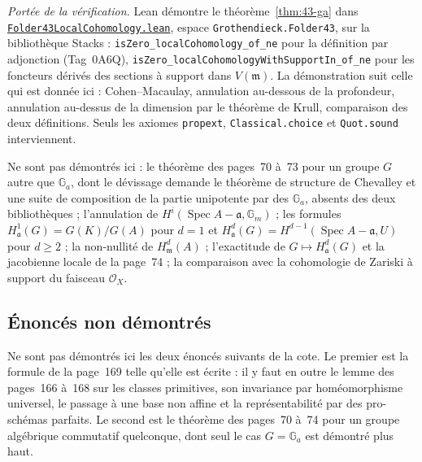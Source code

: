 \begingroup\raggedright
\noindent\emph{Portée de la vérification.} Lean démontre le théorème~\ref{thm:43-ga} dans \href{\leanblobmain/RingTheory/Folder43LocalCohomology.lean}{\texttt{Folder43LocalCohomology.\allowbreak{}lean}}, espace \texttt{Grothendieck.\allowbreak{}Folder43}, sur la bibliothèque Stacks : \texttt{isZero\_localCohomology\_of\_ne} pour la définition par adjonction (Tag~0A6Q), \texttt{isZero\_localCohomologyWithSupportIn\_of\_ne} pour les foncteurs dérivés des sections à support dans $V(\mathfrak m)$. La démonstration suit celle qui est donnée ici : Cohen--Macaulay, annulation au-dessous de la profondeur, annulation au-dessus de la dimension par le théorème de Krull, comparaison des deux définitions. Seuls les axiomes \texttt{propext}, \texttt{Classical.choice} et \texttt{Quot.sound} interviennent.\par\endgroup

Ne sont pas démontrés ici : le théorème des pages~70 à~73 pour un groupe $G$ autre que $\mathbb G_a$, dont le dévissage demande le théorème de structure de Chevalley et une suite de composition de la partie unipotente par des $\mathbb G_a$, absents des deux bibliothèques ; l'annulation de $H^i(\operatorname{Spec} A - \mathfrak a, \mathbb G_m)$ ; les formules $H^1_{\mathfrak a}(G) = G(K)/G(A)$ pour $d = 1$ et $H^d_{\mathfrak a}(G) = H^{d-1}(\operatorname{Spec} A - \mathfrak a, U)$ pour $d \geq 2$ ; la non-nullité de $H^d_{\mathfrak m}(A)$ ; l'exactitude de $G \mapsto H^d_{\mathfrak a}(G)$ et la jacobienne locale de la page~74 ; la comparaison avec la cohomologie de Zariski à support du faisceau $\mathcal O_X$.

\subsection*{Énoncés non démontrés}

Ne sont pas démontrés ici les deux énoncés suivants de la cote. Le premier est la formule de la page~169 telle qu'elle est écrite : il y faut en outre le lemme des pages~166 à~168 sur les classes primitives, son invariance par homéomorphisme universel, le passage à une base non affine et la représentabilité par des pro-schémas parfaits. Le second est le théorème des pages~70 à~74 pour un groupe algébrique commutatif quelconque, dont seul le cas $G = \mathbb G_a$ est démontré plus haut.

